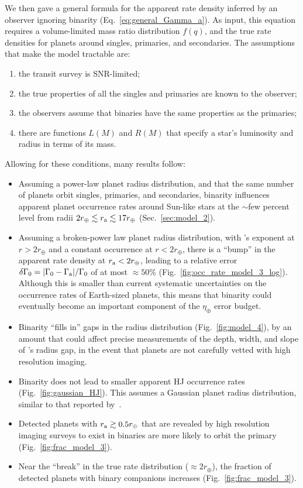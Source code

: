 \documentclass[12pt,modern]{aastex61}
\renewcommand{\a}{_{\rm a}}
\begin{document}
We then gave a general formula for the apparent rate density inferred by an 
observer ignoring binarity (Eq.~\ref{eq:general_Gamma_a}).
As input, this equation requires a volume-limited mass ratio distribution 
$f(q)$, and the true rate densities for planets around singles, 
primaries, and secondaries.
The assumptions that make the model tractable are:
\begin{enumerate}
    \item the transit survey is SNR-limited;
    \item the true properties of all the singles and primaries are known to 
    the observer;
    \item the observers assume that binaries have the same properties as the 
    primaries;
    \item there are functions $L(M)$ and $R(M)$ that specify a star's 
    luminosity and radius in terms of its mass.
\end{enumerate}
Allowing for these conditions, many results follow:
\begin{itemize}
%
\item Assuming a power-law planet radius distribution, and that the same 
number of planets orbit singles, primaries, and secondaries, binarity 
influences apparent planet occurrence rates around Sun-like stars at the 
$\sim$few percent level from radii $2r_\oplus \lesssim r\a \lesssim 
17r_\oplus$ (Sec.~\ref{sec:model_2}).
%
\item Assuming a broken-power law planet radius distribution, with 
\citet{howard_planet_2012}'s exponent at $r > 2r_\oplus$ and a constant 
occurrence at $r < 2r_\oplus$, there is a ``bump'' in the apparent rate 
density at $r\a < 2r_\oplus$, leading to a relative error $\delta \Gamma_0 = 
|\Gamma_0 - \Gamma\a|/\Gamma_0$ of at most $\approx 50\%$ 
(Fig.~\ref{fig:occ_rate_model_3_log}).
Although this is smaller than current systematic uncertainties on the 
occurrence rates of Earth-sized planets, this means that binarity could
eventually become an important component of the $\eta_\oplus$ error budget.
%
\item Binarity ``fills in'' gaps in the radius distribution 
(Fig.~\ref{fig:model_4}), by an amount that could affect precise measurements 
of the depth, width, and slope of \citet{fulton_california-_2017}'s radius 
gap, in the event that planets are not carefully vetted with high resolution 
imaging.
%
\item Binarity does not lead to smaller apparent HJ occurrence rates 
(Fig.~\ref{fig:gaussian_HJ}).
This assumes a Gaussian planet radius distribution, similar to that reported 
by~\citet{petigura_CKS_2017}.
%
\item Detected planets with $r\a \gtrsim 0.5r_\oplus$ that are revealed by 
high resolution imaging surveys to exist in binaries are more likely to orbit 
the primary (Fig.~\ref{fig:frac_model_3}).
%
\item Near the ``break'' in the true rate distribution ($\approx 2r_\oplus$), 
the fraction of detected planets with binary companions increases
(Fig.~\ref{fig:frac_model_3}).
\end{itemize}
\end{document}
